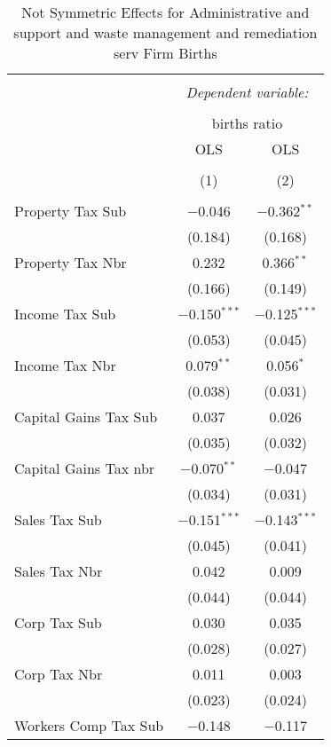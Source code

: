 
\begin{table}[!htbp] \centering 
  \caption{Not Symmetric Effects for  Administrative and support and waste management and remediation serv Firm Births} 
  \label{56noequality} 
\begin{tabular}{@{\extracolsep{5pt}}lcc} 
\\[-1.8ex]\hline 
\hline \\[-1.8ex] 
 & \multicolumn{2}{c}{\textit{Dependent variable:}} \\ 
\cline{2-3} 
\\[-1.8ex] & \multicolumn{2}{c}{births ratio} \\ 
 & OLS & OLS \\ 
\\[-1.8ex] & (1) & (2)\\ 
\hline \\[-1.8ex] 
 Property Tax Sub & $-$0.046 & $-$0.362$^{**}$ \\ 
  & (0.184) & (0.168) \\ 
  Property Tax Nbr & 0.232 & 0.366$^{**}$ \\ 
  & (0.166) & (0.149) \\ 
  Income Tax Sub & $-$0.150$^{***}$ & $-$0.125$^{***}$ \\ 
  & (0.053) & (0.045) \\ 
  Income Tax Nbr & 0.079$^{**}$ & 0.056$^{*}$ \\ 
  & (0.038) & (0.031) \\ 
  Capital Gains Tax Sub & 0.037 & 0.026 \\ 
  & (0.035) & (0.032) \\ 
  Capital Gains Tax nbr & $-$0.070$^{**}$ & $-$0.047 \\ 
  & (0.034) & (0.031) \\ 
  Sales Tax Sub & $-$0.151$^{***}$ & $-$0.143$^{***}$ \\ 
  & (0.045) & (0.041) \\ 
  Sales Tax Nbr & 0.042 & 0.009 \\ 
  & (0.044) & (0.044) \\ 
  Corp Tax Sub & 0.030 & 0.035 \\ 
  & (0.028) & (0.027) \\ 
  Corp Tax Nbr & 0.011 & 0.003 \\ 
  & (0.023) & (0.024) \\ 
  Workers Comp Tax Sub & $-$0.148 & $-$0.117 \\ 

\end{tabular}
\end{table}
